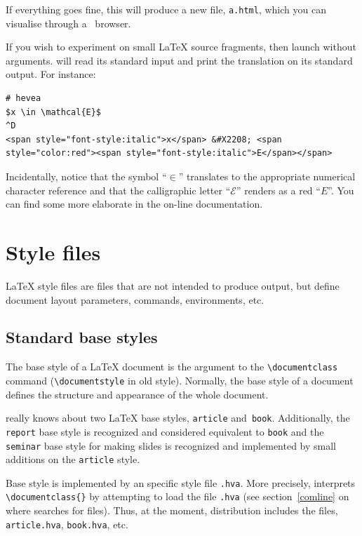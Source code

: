 If everything goes fine, this will produce a new file,
\texttt{a.html}, which you can visualise through  a {\html}~browser.


If you wish to experiment \hevea{} on small \LaTeX{} source fragments,
then launch \hevea{} without arguments. \hevea{} will read its
standard input and print the translation on its standard output.
For instance:
\begin{verbatim}
# hevea
$x \in \mathcal{E}$
^D
<span style="font-style:italic">x</span> &#X2208; <span style="color:red"><span style="font-style:italic">E</span></span>
\end{verbatim}
Incidentally, notice that the symbol ``$\in$'' translates to the
appropriate numerical character reference and that the calligraphic
letter ``$\mathcal{E}$'' renders as a red ``$E$''. You can find some
more elaborate  in
the on-line documentation.

\section{Style files}
\LaTeX{} style files are files that are not intended to produce output, but
define document layout parameters, commands, environments, etc.

\subsection{Standard base styles}

The base style of a \LaTeX{} document is the argument to the
\verb+\documentclass+ command (\verb+\documentstyle+ in old style).
Normally, the base style of a document defines the structure and
appearance of the whole document.



\noindent\hevea{} really knows about two \LaTeX{} base styles,
\texttt{article} and~\texttt{book}.
Additionally, the \texttt{report} base style is recognized and
considered equivalent to \texttt{book} and the
\texttt{seminar} base style for making slides is recognized and
implemented by small additions on the \texttt{article} style.


Base style  is implemented by an \hevea{} specific
style file \verb+.hva+.
More precisely, \hevea{} interprets
\verb+\documentclass{+\verb+}+ by attempting to load
the file \verb+.hva+ (see section~\ref{comline} on where
\hevea{} searches for files).
Thus, at the moment, \hevea{} distribution includes the files,
\texttt{article.hva}, \texttt{book.hva}, etc.


